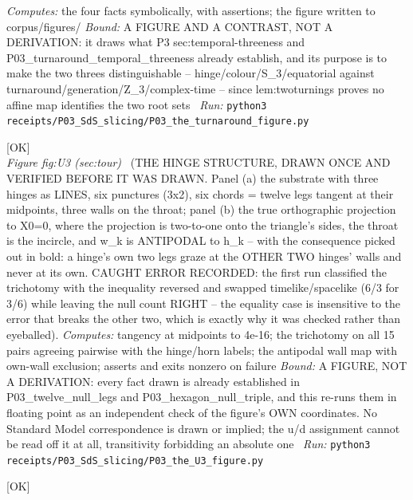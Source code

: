 \begin{description}
\emph{Computes:} the four facts symbolically, with assertions; the figure written to corpus/figures/
 \emph{Bound:} A FIGURE AND A CONTRAST, NOT A DERIVATION: it draws what P3 sec:temporal-threeness and P03\_turnaround\_temporal\_threeness already establish, and its purpose is to make the two threes distinguishable -- hinge/colour/S\_3/equatorial against turnaround/generation/Z\_3/complex-time -- since lem:twoturnings proves no affine map identifies the two root sets
\ \emph{Run:} \texttt{python3 receipts/P03\_SdS\_slicing/P03\_the\_turnaround\_figure.py}
\item[\rcptlabel{P03_the_U3_figure}{P3R45}\textbf{P3R45}\quad\texttt{P03\_the\_U3\_figure}]\hfill\textsf{[OK]}\\
\textit{Figure fig:U3 (sec:tour)} \ (THE HINGE STRUCTURE, DRAWN ONCE AND VERIFIED BEFORE IT WAS DRAWN. Panel (a) the substrate with three hinges as LINES, six punctures (3x2), six chords = twelve legs tangent at their midpoints, three walls on the throat; panel (b) the true orthographic projection to X0=0, where the projection is two-to-one onto the triangle's sides, the throat is the incircle, and w\_k is ANTIPODAL to h\_k -- with the consequence picked out in bold: a hinge's own two legs graze at the OTHER TWO hinges' walls and never at its own. CAUGHT ERROR RECORDED: the first run classified the trichotomy with the inequality reversed and swapped timelike/spacelike (6/3 for 3/6) while leaving the null count RIGHT -- the equality case is insensitive to the error that breaks the other two, which is exactly why it was checked rather than eyeballed). 
\emph{Computes:} tangency at midpoints to 4e-16; the trichotomy on all 15 pairs agreeing pairwise with the hinge/horn labels; the antipodal wall map with own-wall exclusion; asserts and exits nonzero on failure
 \emph{Bound:} A FIGURE, NOT A DERIVATION: every fact drawn is already established in P03\_twelve\_null\_legs and P03\_hexagon\_null\_triple, and this re-runs them in floating point as an independent check of the figure's OWN coordinates. No Standard Model correspondence is drawn or implied; the u/d assignment cannot be read off it at all, transitivity forbidding an absolute one
\ \emph{Run:} \texttt{python3 receipts/P03\_SdS\_slicing/P03\_the\_U3\_figure.py}
\item[\rcptlabel{P03_locus_sweep}{P3R46}\textbf{P3R46}\quad\texttt{P03\_locus\_sweep}]\hfill\textsf{[OK]}\\

\end{description}
